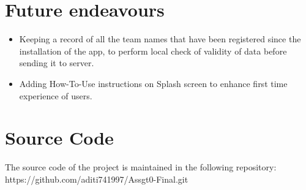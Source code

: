 \documentclass{article}
\begin{document}
\section{Future endeavours}
\begin{itemize}
\item Keeping a record of all the team names that have been registered since the installation of the app, to perform local check of validity of data before sending it to server.
\item Adding How-To-Use instructions on Splash screen to enhance first time experience of users.
\end{itemize}


\section{Source Code}
\par\noindent The source code of the project is maintained in the following repository:\\
https://github.com/aditi741997/Assgt0-Final.git


\medskip

\end{document}
